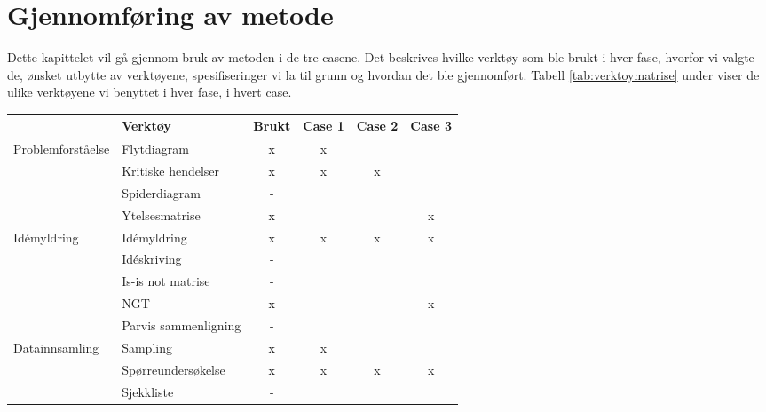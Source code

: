 \chapter{Gjennomføring av metode}
Dette kapittelet vil gå gjennom bruk av metoden i de tre casene. Det beskrives hvilke verktøy som ble brukt i hver fase, hvorfor vi valgte de, ønsket utbytte av verktøyene, spesifiseringer vi la til grunn og hvordan det ble gjennomført. Tabell \ref{tab:verktoymatrise} under viser de ulike verktøyene vi benyttet i hver fase, i hvert case. 
\begin{table}[htbp]
  \centering
    \begin{tabular}{|l|l|c|r|r|r|}
    \hline
         \cellcolor{yellow} & \cellcolor{yellow} Verktøy & \cellcolor{yellow} Brukt & \multicolumn{1}{c|}{\cellcolor{yellow} Case 1} & \multicolumn{1}{c|}{\cellcolor{yellow} Case 2} & \multicolumn{1}{c|}{\cellcolor{yellow} Case 3} \\
    \hline
    \multicolumn{1}{|l|}{\multirow{4}[8]{*}{Problemforståelse}} & Flytdiagram & x     & \multicolumn{1}{c|}{x} &       &  \\
\cline{2-6}          & Kritiske hendelser & x     & \multicolumn{1}{c|}{x} & \multicolumn{1}{c|}{x} &  \\
\cline{2-6}          & Spiderdiagram & -     &       &       &  \\
\cline{2-6}          & Ytelsesmatrise & x     &       &       & \multicolumn{1}{c|}{x} \\
    \hline
    \multicolumn{1}{|l|}{\multirow{5}[10]{*}{Idémyldring}} & Idémyldring & x     & \multicolumn{1}{c|}{x} & \multicolumn{1}{c|}{x} & \multicolumn{1}{c|}{x} \\
\cline{2-6}          & Idéskriving & -     &       &       &  \\
\cline{2-6}          & Is-is not matrise & -     &       &       &  \\
\cline{2-6}          & NGT   & x     &       &       & \multicolumn{1}{c|}{x} \\
\cline{2-6}          & Parvis sammenligning & -     &       &       &  \\
    \hline
    \multicolumn{1}{|l|}{\multirow{3}[6]{*}{Datainnsamling}} & Sampling & x     &  \multicolumn{1}{c|}{x}  &       &  \\
\cline{2-6}          & Spørreundersøkelse & x     & \multicolumn{1}{c|}{x} & \multicolumn{1}{c|}{x} & \multicolumn{1}{c|}{x} \\
\cline{2-6}          & Sjekkliste & -     &       &       &  \\

\end{tabular}
\end{table}
